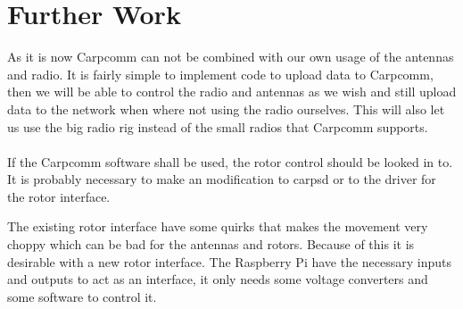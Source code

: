 \section{Further Work}
As it is now Carpcomm can not be combined with our own usage of the antennas and radio. It is fairly simple to implement code to upload data to Carpcomm, then we will be able to control the radio and antennas as we wish and still upload data to the network when where not using the radio ourselves. This will also let us use the big radio rig instead of the small radios that Carpcomm supports.

\paragraph*{}
If the Carpcomm software shall be used, the rotor control should be looked in to. It is probably necessary to make an modification to carpsd or to the driver for the rotor interface.

The existing rotor interface have some quirks that makes the movement very choppy which can be bad for the antennas and rotors. Because of this it is desirable with a new rotor interface. The Raspberry Pi have the necessary inputs and outputs to act as an interface, it only needs some voltage converters and some software to control it.
